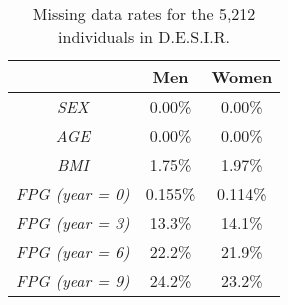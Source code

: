 \begin{table}[ht]
\centering
\caption{Missing data rates for the 5,212 individuals in D.E.S.I.R.} 
\label{tab:desirNA}
{\footnotesize
\begin{tabular}{ccc}
  \textit{} & Men & Women \\ 
   \hline
\textit{SEX} & 0.00\% & 0.00\% \\ 
  \textit{AGE} & 0.00\% & 0.00\% \\ 
  \textit{BMI} & 1.75\% & 1.97\% \\ 
   \hline
\textit{FPG (year = 0)} & 0.155\% & 0.114\% \\ 
  \textit{FPG (year = 3)} & 13.3\% & 14.1\% \\ 
  \textit{FPG (year = 6)} & 22.2\% & 21.9\% \\ 
  \textit{FPG (year = 9)} & 24.2\% & 23.2\% \\ 
   \hline
\end{tabular}
}
\end{table}
